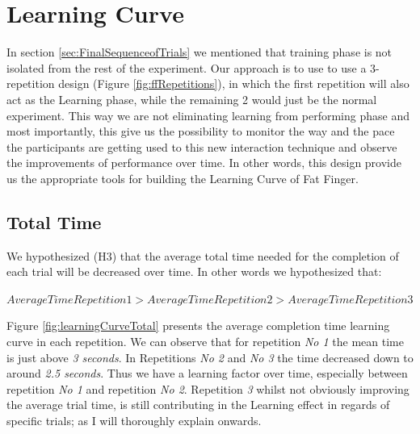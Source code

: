 \section{Learning Curve}
\label{resultsLearningCurve}

In section \ref{sec:FinalSequenceofTrials} we mentioned that training phase is not isolated from the rest of the experiment. Our approach is to use to use a 3-repetition design (Figure \ref{fig:ffRepetitions}), in which the first repetition will also act as the Learning phase, while the remaining 2 would just be the normal experiment. 
This way we are not eliminating learning from performing phase and most importantly, this give us the possibility to monitor the way and the pace the participants are getting used to this new interaction technique and observe the improvements of performance over time. In other words, this design provide us the appropriate tools for building the Learning Curve of Fat Finger.

\subsection{Total Time}
\label{sec:LCtotalTime}
We hypothesized (H3) that the average total time needed for the completion of each trial will be decreased over time. In other words we hypothesized that:

 $AverageTimeRepetition1 > AverageTimeRepetition2 > AverageTimeRepetition3$ 

Figure \ref{fig:learningCurveTotal} presents the average completion time learning curve in each repetition. We can observe that for repetition \emph{No 1} the mean time is just above \emph{3 seconds}. In Repetitions \emph{No 2} and \emph{No 3} the time decreased down to around \emph{2.5 seconds}. Thus we have a learning factor over time, especially between repetition \emph{No 1} and repetition \emph{No 2}. Repetition \emph{3} whilst not obviously improving the average trial time, is still contributing in the Learning effect in regards of specific trials; as I will thoroughly explain onwards. 

